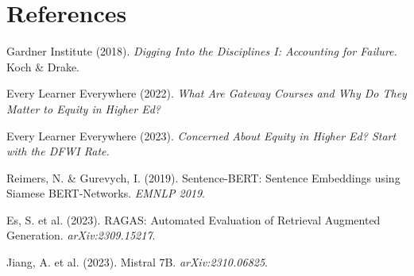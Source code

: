 \documentclass[11pt]{article}
\begin{document}
\section*{References}

\begin{enumerate}[label={[\arabic*]}]
  \item Gardner Institute (2018). \textit{Digging Into the Disciplines I: Accounting for Failure.} Koch \& Drake.
  \item Every Learner Everywhere (2022). \textit{What Are Gateway Courses and Why Do They Matter to Equity in Higher Ed?}
  \item Every Learner Everywhere (2023). \textit{Concerned About Equity in Higher Ed? Start with the DFWI Rate.}
  \item Reimers, N. \& Gurevych, I. (2019). Sentence-BERT: Sentence Embeddings using Siamese BERT-Networks. \textit{EMNLP 2019}.
  \item Es, S. et al. (2023). RAGAS: Automated Evaluation of Retrieval Augmented Generation. \textit{arXiv:2309.15217}.
  \item Jiang, A. et al. (2023). Mistral 7B. \textit{arXiv:2310.06825}.
\end{enumerate}
\end{document}
